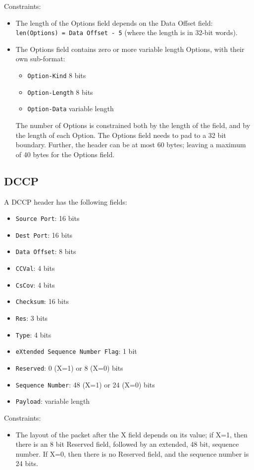 \documentclass[10pt,a4paper]{article}
\begin{document}
Constraints:
\begin{itemize}
\item The length of the Options field depends on the Data Offset field:
\texttt{len(Options) = Data Offset - 5} (where the length is in 32-bit words).
\item The Options field contains zero or more variable length Options, with their own
sub-format:
\begin{itemize}
\item \texttt{Option-Kind} 8 bits
\item \texttt{Option-Length} 8 bits
\item \texttt{Option-Data} variable length
\end{itemize}
The number of Options is constrained both by the length of the field, and by the length
of each Option. The Options field needs to pad to a 32 bit boundary. Further, the header
can be at most 60 bytes; leaving a maximum of 40 bytes for the Options field.
\end{itemize}

\subsection{DCCP}

A DCCP header has the following fields:
\begin{itemize}
\item \texttt{Source Port}: 16 bits
\item \texttt{Dest Port}: 16 bits
\item \texttt{Data Offset}: 8 bits
\item \texttt{CCVal}: 4 bits
\item \texttt{CsCov}: 4 bits
\item \texttt{Checksum}: 16 bits
\item \texttt{Res}: 3 bits
\item \texttt{Type}: 4 bits
\item \texttt{eXtended Sequence Number Flag}: 1 bit
\item \texttt{Reserved}: 0 (X=1) or 8 (X=0) bits
\item \texttt{Sequence Number}: 48 (X=1) or 24 (X=0) bits
\item \texttt{Payload}: variable length
\end{itemize}

Constraints:
\begin{itemize}
\item The layout of the packet after the X field depends on its value; if X=1, then there
is an 8 bit Reserved field, followed by an extended, 48 bit, sequence number. If X=0, then
there is no Reserved field, and the sequence number is 24 bits.
\end{itemize}
\end{document}
